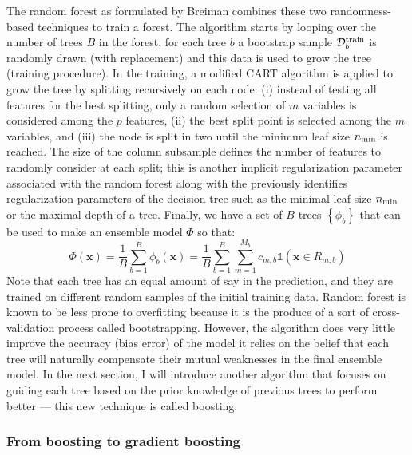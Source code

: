\documentclass[main]{subfiles}
\begin{document}
The random forest as formulated by Breiman combines these two randomness-based techniques to train a forest.\autocite{Breiman_2001} The algorithm starts by looping over the number of trees $B$ in the forest, for each tree $b$ a bootstrap sample $\mathcal{D}^{\text{train}}_b$ is randomly drawn (with replacement) and this data is used to grow the tree (training procedure). In the training, a modified CART algorithm is applied to grow the tree by splitting recursively on each node: (i) instead of testing all features for the best splitting, only a random selection of $m$ variables is considered among the $p$ features, (ii) the best split point is selected among the $m$ variables, and (iii) the node is split in two until the minimum leaf size $n_{\text{min}}$ is reached. The size of the column subsample defines the number of features to randomly consider at each split; this is another implicit regularization parameter associated with the random forest along with the previously identifies regularization parameters of the decision tree such as the minimal leaf size $n_{\text{min}}$ or the maximal depth of a tree. Finally, we have a set of $B$ trees $\left\{\phi_b\right\}$ that can be used to make an ensemble model $\Phi$ so that:
\begin{equation}
  \Phi(\mathbf{x}) = \frac{1}{B}\sum_{b=1}^{B} \phi_b(\mathbf{x}) = \frac{1}{B}\sum_{b=1}^{B}\sum_{m=1}^{M_b} c_{m,b} \mathbb{1}(\mathbf{x}\in R_{m,b})
\end{equation}
Note that each tree has an equal amount of say in the prediction, and they are trained on different random samples of the initial training data. Random forest is known to be less prone to overfitting because it is the produce of a sort of cross-validation process called bootstrapping. However, the algorithm does very little improve the accuracy (bias error) of the model it relies on the belief that each tree will naturally compensate their mutual weaknesses in the final ensemble model. In the next section, I will introduce another algorithm that focuses on guiding each tree based on the prior knowledge of previous trees to perform better --- this new technique is called boosting.

\subsubsection{From boosting to gradient boosting}\label{sct:boosting}
\end{document}

